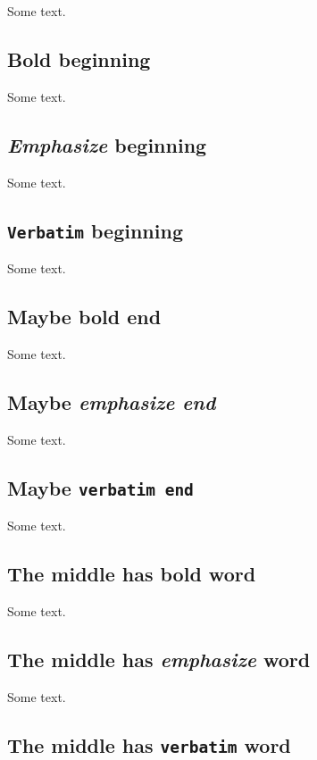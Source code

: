 \documentclass[%
oneside,                 %
final,                   %
10pt]{article}
\theoremstyle{definition}
\begin{document}
\begin{enumerate}
Some text.

\subsection{\textbf{Bold} beginning}

Some text.

\subsection{\emph{Emphasize} beginning}

Some text.

\subsection{\texttt{Verbatim} beginning}

Some text.

\subsection{Maybe \textbf{bold end}}

Some text.

\subsection{Maybe \emph{emphasize end}}

Some text.

\subsection{Maybe \texttt{verbatim end} }

Some text.

\subsection{The middle has \textbf{bold} word}

Some text.

\subsection{The middle has \emph{emphasize} word}

Some text.

\subsection{The middle has \texttt{verbatim} word}


\end{enumerate}
\end{document}
